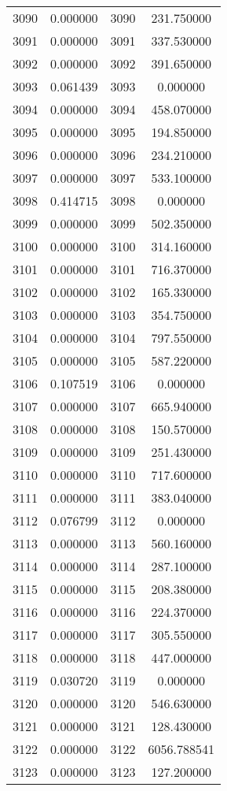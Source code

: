 \documentclass[12pt]{article}
\begin{document}
\begin{longtable}{@{}cccc@{}}
3090 & 0.000000 & 3090 & 231.750000 \\
3091 & 0.000000 & 3091 & 337.530000 \\
3092 & 0.000000 & 3092 & 391.650000 \\
3093 & 0.061439 & 3093 & 0.000000 \\
3094 & 0.000000 & 3094 & 458.070000 \\
3095 & 0.000000 & 3095 & 194.850000 \\
3096 & 0.000000 & 3096 & 234.210000 \\
3097 & 0.000000 & 3097 & 533.100000 \\
3098 & 0.414715 & 3098 & 0.000000 \\
3099 & 0.000000 & 3099 & 502.350000 \\
3100 & 0.000000 & 3100 & 314.160000 \\
3101 & 0.000000 & 3101 & 716.370000 \\
3102 & 0.000000 & 3102 & 165.330000 \\
3103 & 0.000000 & 3103 & 354.750000 \\
3104 & 0.000000 & 3104 & 797.550000 \\
3105 & 0.000000 & 3105 & 587.220000 \\
3106 & 0.107519 & 3106 & 0.000000 \\
3107 & 0.000000 & 3107 & 665.940000 \\
3108 & 0.000000 & 3108 & 150.570000 \\
3109 & 0.000000 & 3109 & 251.430000 \\
3110 & 0.000000 & 3110 & 717.600000 \\
3111 & 0.000000 & 3111 & 383.040000 \\
3112 & 0.076799 & 3112 & 0.000000 \\
3113 & 0.000000 & 3113 & 560.160000 \\
3114 & 0.000000 & 3114 & 287.100000 \\
3115 & 0.000000 & 3115 & 208.380000 \\
3116 & 0.000000 & 3116 & 224.370000 \\
3117 & 0.000000 & 3117 & 305.550000 \\
3118 & 0.000000 & 3118 & 447.000000 \\
3119 & 0.030720 & 3119 & 0.000000 \\
3120 & 0.000000 & 3120 & 546.630000 \\
3121 & 0.000000 & 3121 & 128.430000 \\
3122 & 0.000000 & 3122 & 6056.788541 \\
3123 & 0.000000 & 3123 & 127.200000 \\

\end{longtable}
\end{document}
